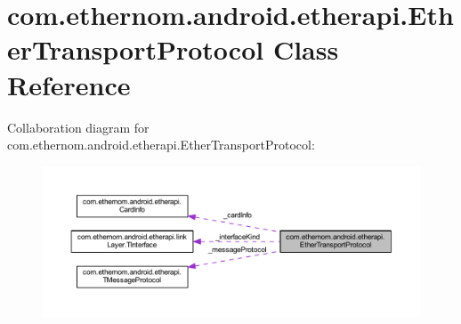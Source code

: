 \hypertarget{classcom_1_1ethernom_1_1android_1_1etherapi_1_1_ether_transport_protocol}{}\section{com.\+ethernom.\+android.\+etherapi.\+Ether\+Transport\+Protocol Class Reference}
\label{classcom_1_1ethernom_1_1android_1_1etherapi_1_1_ether_transport_protocol}


Collaboration diagram for com.\+ethernom.\+android.\+etherapi.\+Ether\+Transport\+Protocol\+:\nopagebreak
\begin{figure}[H]
\begin{center}
\leavevmode
\includegraphics[width=350pt]{classcom_1_1ethernom_1_1android_1_1etherapi_1_1_ether_transport_protocol__coll__graph}
\end{center}
\end{figure}
